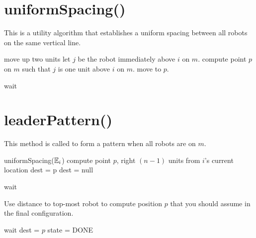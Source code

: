 \documentclass[preprint,10pt]{elsarticle}
\begin{document}
\section{uniformSpacing()} 
This is a utility algorithm that establishes a uniform spacing between all robots on
the same vertical line.
\begin{algorithm}
\begin{algorithmic}[1]
		\State move up two units
	\EndIf
	\State let $j$ be the robot immediately above $i$ on $m$.
	\State compute point $p$ on $m$ such that $j$ is one
	unit above $i$ on $m$.
	\State move to $p$.

		\State wait
	\EndWhile
\EndProcedure
\end{algorithmic}
\end{algorithm}

\section{leaderPattern()} 
This method is called to form a pattern when all robots are on $m$.
\begin{algorithm}[H]
\begin{algorithmic}[1]

	uniformSpacing($\mathbb{E}_i$) %
		\State compute point $p$, right $(n-1)$ units from $i$'s current location
		\State dest = p
	\Else
		dest = null
	\EndIf

		\State wait
	\EndWhile

	\State Use distance to top-most robot to compute position $p$ that you
	should assume in the final configuration.

		\State wait
	\EndWhile
	\State dest = $p$
	\State state = DONE


\EndProcedure
\end{algorithmic}
\end{algorithm}

 

\end{document}
